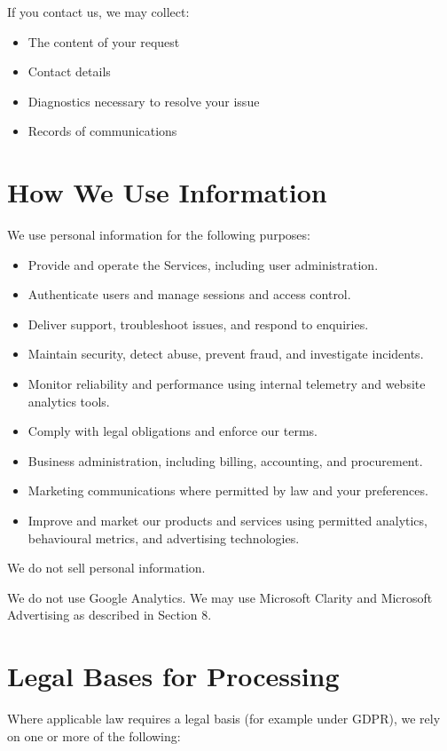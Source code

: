 \documentclass[11pt]{article}
\begin{document}
If you contact us, we may collect:

\begin{itemize}
\item The content of your request
\item Contact details
\item Diagnostics necessary to resolve your issue
\item Records of communications
\end{itemize}

\section{How We Use Information}

We use personal information for the following purposes:

\begin{itemize}
\item Provide and operate the Services, including user administration.
\item Authenticate users and manage sessions and access control.
\item Deliver support, troubleshoot issues, and respond to enquiries.
\item Maintain security, detect abuse, prevent fraud, and investigate incidents.
\item Monitor reliability and performance using internal telemetry and website analytics tools.
\item Comply with legal obligations and enforce our terms.
\item Business administration, including billing, accounting, and procurement.
\item Marketing communications where permitted by law and your preferences.
\item Improve and market our products and services using permitted analytics, behavioural metrics, and advertising technologies.
\end{itemize}

We do not sell personal information.

We do not use Google Analytics. We may use Microsoft Clarity and Microsoft Advertising as described in Section 8.

\section{Legal Bases for Processing}

Where applicable law requires a legal basis (for example under GDPR), we rely on one or more of the following:
\end{document}
